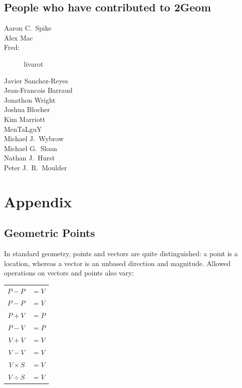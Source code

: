 \documentclass[openany]{book}
\begin{document}
\section{People who have contributed to 2Geom}
\begin{description}
\item[Aaron C.\ Spike]
\item[Alex Mac]
\item[Fred:] livarot
\item[Javier Sanchez-Reyes]
\item[Jean-Francois Barraud]
\item[Jonathon Wright]
\item[Joshua Blocher]
\item[Kim Marriott]
\item[MenTaLguY]
\item[Michael J.\ Wybrow]
\item[Michael G.\ Sloan]
\item[Nathan J.\ Hurst]
\item[Peter J.\ R.\ Moulder]
\end{description}

\chapter{Appendix}
\renewcommand{\thesection}{\Alph{section}}

\section{Geometric Points}
In standard geometry, points and vectors are quite distinguished: a
point is a location, whereas a vector is an unbased direction and
magnitude.  Allowed operations on vectors and points also vary:

\begin{tabular}{r l}
  $P - P$ & $= V$ \\

  $P - P$ & $= V$ \\

  $P + V$ & $= P$ \\

  $P - V$ & $= P$ \\

  $V + V$ & $= V$ \\

  $V - V$ & $= V$ \\

  $V \times S$ & $= V$ \\

  $V \div S$ & $= V$ \\
\end{tabular}
\end{document}
